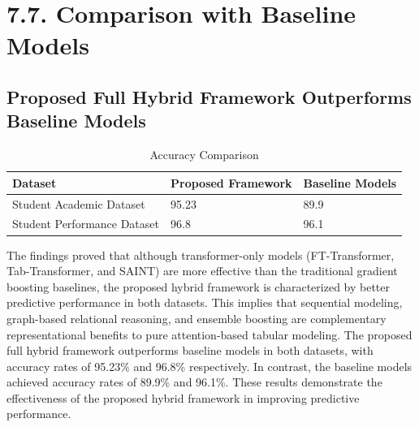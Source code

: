 \documentclass[twocolumn]{svjour3}
\begin{document}
\section{7.7. Comparison with Baseline Models}
\subsection{Proposed Full Hybrid Framework Outperforms Baseline Models}
\begin{table}
\centering
\caption{Accuracy Comparison}
\begin{tabular}{lll}
\hline
Dataset & Proposed Framework & Baseline Models \\
\hline
Student Academic Dataset & 95.23 & 89.9 \\
Student Performance Dataset & 96.8 & 96.1 \\
\hline
\end{tabular}
\end{table}
The findings proved that although transformer-only models (FT-Transformer, Tab-Transformer, and SAINT) are more effective than the traditional gradient boosting baselines, the proposed hybrid framework is characterized by better predictive performance in both datasets. This implies that sequential modeling, graph-based relational reasoning, and ensemble boosting are complementary representational benefits to pure attention-based tabular modeling.
The proposed full hybrid framework outperforms baseline models in both datasets, with accuracy rates of 95.23\% and 96.8\% respectively. In contrast, the baseline models achieved accuracy rates of 89.9\% and 96.1\%. These results demonstrate the effectiveness of the proposed hybrid framework in improving predictive performance.
\end{document}
